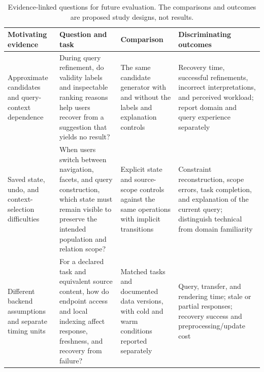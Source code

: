 \documentclass[manuscript,review,screen]{acmart}
\begin{document}
\begin{table}[htbp]
\centering\footnotesize
\caption{Evidence-linked questions for future evaluation. The comparisons and outcomes are proposed study designs, not results.}
\label{tab:research-agenda}
\begin{tabularx}{\linewidth}{L{30mm} Y Y Y}
\toprule Motivating evidence & Question and task & Comparison & Discriminating outcomes\\\midrule
Approximate candidates and query-context dependence \citep{2021_Parra_Fast_Approximate,2020_Lissandrini_Graph-Query_Suggestions} & During query refinement, do validity labels and inspectable ranking reasons help users recover from a suggestion that yields no result? & The same candidate generator with and without the labels and explanation controls & Recovery time, successful refinements, incorrect interpretations, and perceived workload; report domain and query experience separately\\
Saved state, undo, and context-selection difficulties \citep{2014_AMA_LODmilla_Shared,2021_Witschel_Natural_Language-based} & When users switch between navigation, facets, and query construction, which state must remain visible to preserve the intended population and relation scope? & Explicit state and source-scope controls against the same operations with implicit transitions & Constraint reconstruction, scope errors, task completion, and explanation of the current query; distinguish technical from domain familiarity\\
Different backend assumptions and separate timing units \citep{2017_Ferre_Sparklis_An,2022_Ikkala_Sampo-UI_A,V3-01765} & For a declared task and equivalent source content, how do endpoint access and local indexing affect response, freshness, and recovery from failure? & Matched tasks and documented data versions, with cold and warm conditions reported separately & Query, transfer, and rendering time; stale or partial responses; recovery success and preprocessing/update cost\\\bottomrule
\end{tabularx}
\end{table}
\end{document}
